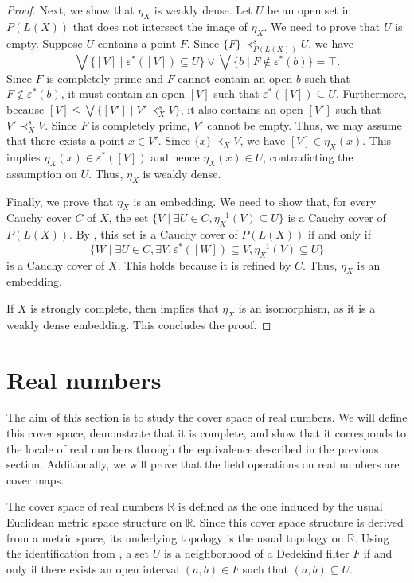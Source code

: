 \documentclass[reqno]{amsart}
\theoremstyle{definition}
\theoremstyle{remark}
\numberwithin{figure}{section}
\newcommand{\rb}{\prec}
\begin{document}
\begin{proof}
Next, we show that $\eta_X$ is weakly dense.
Let $U$ be an open set in $P(L(X))$ that does not intersect the image of $\eta_X$.
We need to prove that $U$ is empty.
Suppose $U$ contains a point $F$.
Since $\{ F \} \rb^s_{P(L(X))} U$, we have 
\[
\bigvee \{ [V] \mid \varepsilon^*([V]) \subseteq U \} \vee \bigvee \{ b \mid F \notin \varepsilon^*(b) \} = \top.
\]
Since $F$ is completely prime and $F$ cannot contain an open $b$ such that $F \notin \varepsilon^*(b)$, it must contain an open $[V]$ such that $\varepsilon^*([V]) \subseteq U$.
Furthermore, because $[V] \leq \bigvee \{ [V'] \mid V' \rb^s_X V \}$, it also contains an open $[V']$ such that $V' \rb^s_X V$.
Since $F$ is completely prime, $V'$ cannot be empty.
Thus, we may assume that there exists a point $x \in V'$.
Since $\{ x \} \rb_X V$, we have $[V] \in \eta_X(x)$.
This implies $\eta_X(x) \in \varepsilon^*([V])$ and hence $\eta_X(x) \in U$, contradicting the assumption on $U$.
Thus, $\eta_X$ is weakly dense.

Finally, we prove that $\eta_X$ is an embedding.
We need to show that, for every Cauchy cover $C$ of $X$, the set $\{ V \mid \exists U \in C, \eta_X^{-1}(V) \subseteq U \}$ is a Cauchy cover of $P(L(X))$.
By , this set is a Cauchy cover of $P(L(X))$ if and only if 
\[
\{ W \mid \exists U \in C, \exists V, \varepsilon^*([W]) \subseteq V, \eta_X^{-1}(V) \subseteq U \}
\]
is a Cauchy cover of $X$.
This holds because it is refined by $C$.
Thus, $\eta_X$ is an embedding.

If $X$ is strongly complete, then  implies that $\eta_X$ is an isomorphism, as it is a weakly dense embedding.
This concludes the proof.
\end{proof}

\section{Real numbers}
\label{sec:reals}

The aim of this section is to study the cover space of real numbers.
We will define this cover space, demonstrate that it is complete, and show that it corresponds to the locale of real numbers through the equivalence described in the previous section.
Additionally, we will prove that the field operations on real numbers are cover maps.

The cover space of real numbers $\mathbb{R}$ is defined as the one induced by the usual Euclidean metric space structure on $\mathbb{R}$.
Since this cover space structure is derived from a metric space, its underlying topology is the usual topology on $\mathbb{R}$.
Using the identification from , a set $U$ is a neighborhood of a Dedekind filter $F$ if and only if there exists an open interval $(a,b) \in F$ such that $(a,b) \subseteq U$.
\end{document}

